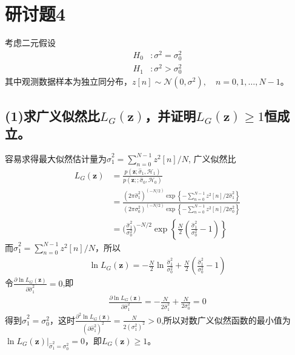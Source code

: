 \documentclass[fontset=windows]{article}
\numberwithin{figure}{section}
\begin{document}
\section*{研讨题4}
考虑二元假设
\begin{align*}
    H_0 & :\sigma^2=\sigma^2_0 \\
    H_1 & :\sigma^2>\sigma^2_0
\end{align*}
其中观测数据样本为独立同分布，\(z[n]\sim \mathcal{N}(0,\sigma^2),\quad n=0,1,\ldots ,N-1。\)

\subsection*{(1)求广义似然比\(L_G(\mathbf{z})\)，并证明\(L_G(\mathbf{z})\geqslant1\)恒成立。}

容易求得最大似然估计量为\(\hat{\sigma}_1^2=\sum_{n=0}^{N-1}z^2[n]/N\),
广义似然比
\begin{align*}
    L_G(\mathbf{z})
     & =\frac{p(\mathbf{z};\hat{\sigma}_1,\mathcal{H}_1)}
    {p(\mathbf{z};;\hat{\sigma}_0,\mathcal{H}_0)}                                                             \\
     & =\frac{(2\pi \hat{\sigma}_1^2)^{(-N/2)}\exp \left\{ -\sum_{n=0}^{N-1}z^2[n]/2\hat{\sigma}_1^2\right\}}
    {(2\pi \sigma_0^2)^{(-N/2)}\exp \left\{ -\sum_{n=0}^{N-1}z^2[n]/2\sigma^2_0\right\}}                      \\
     & =\bigg(\frac{\hat{\sigma}_1^2}{\sigma_0^2}\bigg)^{-N/2}
    \exp\left\{\frac{N}{2}(\frac{\hat{\sigma}_1^2}{\sigma_0^2}-1) \right\}
\end{align*}
而\(\hat{\sigma}_1^2=\sum_{n=0}^{N-1}z^2[n]/N\)，所以
\begin{align*}
    \ln L_G(\mathbf{z})=-\frac{N}{2}\ln\frac{\hat{\sigma}_1^2}{\sigma_0^2}+\frac{N}{2}(\frac{\hat{\sigma}_1^2}{\sigma_0^2}-1)
\end{align*}
令\(\frac{\partial \ln L_G(\mathbf{z})}{\partial \hat{\sigma}_1^2}=0\),即
\begin{align*}
    \frac{\partial \ln L_G(\mathbf{z})}{\partial \hat{\sigma}_1^2}=
    -\frac{N}{2\hat{\sigma}_1^2}+\frac{N}{2\sigma_0^2}=0
\end{align*}
得到\(\hat{\sigma}_1^2=\sigma_0^2\)，这时\(\frac{\partial^2 \ln L_G(\mathbf{z})}{(\partial \hat{\sigma}_1^2)^2}=\frac{N}{2(\sigma^2_1)^2}>0\),所以对数广义似然函数的最小值为\(\ln L_G(\mathbf{z})|_{\hat{\sigma}_1^2=\sigma_0^2}=0\)，即\(L_G(\mathbf{z})\geqslant1\)。
\end{document}
